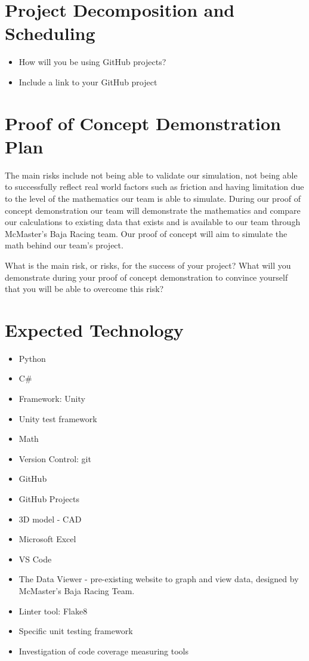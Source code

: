 \documentclass{article}
\begin{document}
\section{Project Decomposition and Scheduling}



\begin{itemize}
  \item How will you be using GitHub projects?
  \item Include a link to your GitHub project
\end{itemize}


\section{Proof of Concept Demonstration Plan}

The main risks include not being able to validate our simulation, not being able to successfully reflect real world factors such as friction and having limitation due to the level of the mathematics our team is able to simulate. During our proof of concept demonstration our team will demonstrate the mathematics and compare our calculations to existing data that exists and is available to our team through McMaster's Baja Racing team. Our proof of concept will aim to simulate the math behind our team's project. 


What is the main risk, or risks, for the success of your project?  What will you
demonstrate during your proof of concept demonstration to convince yourself that
you will be able to overcome this risk?

\section{Expected Technology}


\begin{itemize}
\item Python
\item C\#
\item Framework: Unity
\item Unity test framework
\item Math
\item Version Control: git
\item GitHub
\item GitHub Projects
\item 3D model - CAD
\item Microsoft Excel
\item VS Code
\item The Data Viewer - pre-existing website to graph and view data, designed by McMaster's Baja Racing Team.
\item Linter tool: Flake8
\item Specific unit testing framework
\item Investigation of code coverage measuring tools
\end{itemize}
\end{document}
